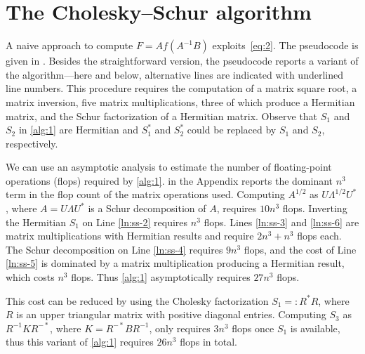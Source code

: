 \documentclass[DIV=14]{scrartcl}
\newcommand{\altline}[1]{\SetNlSty{}{\underline}{} \quad #1 \SetNlSty{}{}{}}
\theoremstyle{thmstyletwo}
\theoremstyle{definition}
\numberwithin{equation}{section}
\newcommand{\deq}{\ensuremath{:=}}
\newcommand{\deqr}{\ensuremath{=:}}
\renewcommand{\Lambda}{\varLambda}
\begin{document}
\section{The Cholesky--Schur algorithm}\label{sec:chsh-alg}

A naive approach to compute $F=Af(A^{-1}B)$ exploits~\eqref{eq:2}.
The pseudocode is given in . Besides the straightforward version, the pseudocode reports
a variant of the algorithm---here and below, alternative lines are indicated with underlined line numbers. This procedure requires the computation of a matrix square root, a matrix inversion, five matrix multiplications, three of which produce a
Hermitian matrix, and the Schur factorization of a Hermitian matrix.
Observe that $S_1$ and $S_2$ in \cref{alg:1} are Hermitian and $S_1^*$ and $S_2^*$ could be replaced by $S_1$ and $S_2$, respectively.

We can use an asymptotic analysis to estimate the number of floating-point operations (flops) required by \cref{alg:1}.  in the Appendix reports the dominant $n^3$ term in the flop count of the matrix operations used.
Computing $A^{1/2}$ as $U \Lambda ^{1/2} U^*$, where $A=U \Lambda U^*$ is a Schur decomposition of $A$, requires $10n^3$ flops. Inverting the Hermitian $S_1$ on Line \ref{ln:ss-2} requires $n^3$ flops.
Lines \ref{ln:ss-3} and \ref{ln:ss-6} are matrix multiplications with Hermitian results and require $2n^3+n^3$ flops each. The Schur decomposition on Line \ref{ln:ss-4} requires $9n^3$ flops, and the cost of Line \ref{ln:ss-5} is dominated by a matrix multiplication producing a Hermitian result, which costs $n^3$ flops. Thus \cref{alg:1} asymptotically requires $27n^3$ flops.

This cost can be reduced by using the Cholesky factorization $S_1 \deqr{} R^*R$, where $R$ is an upper triangular matrix with positive diagonal entries.
Computing $S_3$ as $R^{-1}KR^{-*}$, where $K=R^{-*}BR^{-1}$, only requires $3n^3$ flops once $S_1$ is available, thus this variant of \cref{alg:1} requires $26n^3$ flops in total.
\end{document}
